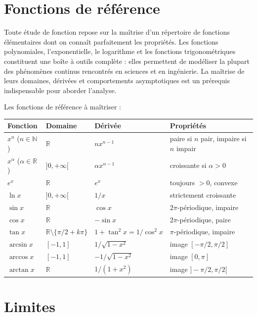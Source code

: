 \documentclass[11pt,a4paper,twoside]{book}
\newcommand{\N}{\mathbb{N}}
\newcommand{\R}{\mathbb{R}}
\begin{document}
\section{Fonctions de référence}

Toute étude de fonction repose sur la maîtrise d'un répertoire de fonctions élémentaires dont on connaît parfaitement les propriétés. Les fonctions polynomiales, l'exponentielle, le logarithme et les fonctions trigonométriques constituent une boîte à outils complète : elles permettent de modéliser la plupart des phénomènes continus rencontrés en sciences et en ingénierie. La maîtrise de leurs domaines, dérivées et comportements asymptotiques est un prérequis indispensable pour aborder l'analyse.

\begin{definitionbox}
Les fonctions de référence à maîtriser :
\begin{center}
\begin{tabular}{llll}
\toprule
Fonction & Domaine & Dérivée & Propriétés \\
\midrule
$x^n$ ($n\in\N$) & $\R$ & $nx^{n-1}$ & paire si $n$ pair, impaire si $n$ impair \\
$x^\alpha$ ($\alpha\in\R$) & $]0,+\infty[$ & $\alpha x^{\alpha-1}$ & croissante si $\alpha>0$ \\
$e^x$ & $\R$ & $e^x$ & toujours $>0$, convexe \\
$\ln x$ & $]0,+\infty[$ & $1/x$ & strictement croissante \\
$\sin x$ & $\R$ & $\cos x$ & $2\pi$-périodique, impaire \\
$\cos x$ & $\R$ & $-\sin x$ & $2\pi$-périodique, paire \\
$\tan x$ & $\R\setminus\{\pi/2+k\pi\}$ & $1+\tan^2 x = 1/\cos^2 x$ & $\pi$-périodique, impaire \\
$\arcsin x$ & $[-1,1]$ & $1/\sqrt{1-x^2}$ & image $[-\pi/2,\pi/2]$ \\
$\arccos x$ & $[-1,1]$ & $-1/\sqrt{1-x^2}$ & image $[0,\pi]$ \\
$\arctan x$ & $\R$ & $1/(1+x^2)$ & image $]-\pi/2,\pi/2[$ \\
\bottomrule
\end{tabular}
\end{center}
\end{definitionbox}

\section{Limites}
\end{document}
